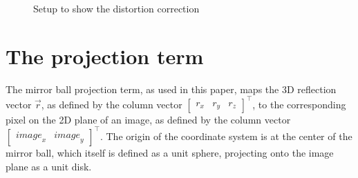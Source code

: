 \documentclass[10pt]{article}
\begin{document}
\begin{multicols}{2}
	\begin{figure}
		\centering
		\hfill
		\hfill
		\hfill
	
		\caption{Setup to show the distortion correction}
		\label{fig:distort}
	\end{figure}

	\section{The projection term}
	The mirror ball projection term, as used in this paper, maps the 3D reflection vector $\vec{r}$, as defined by the column vector $	\begin{bmatrix}
		r_x & r_y & r_z
	\end{bmatrix}^\intercal$, to the corresponding pixel on the 2D plane of an image, as defined by the column vector $\begin{bmatrix} {image}_x & {image}_y \end{bmatrix}^\intercal$. The origin of the coordinate system is at the center of the mirror ball, which itself is defined as a unit sphere, projecting onto the image plane as a unit disk.


\end{multicols}
\end{document}
